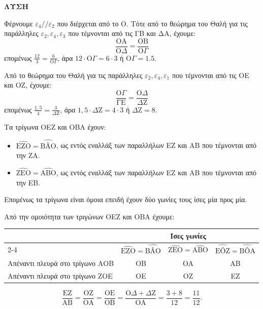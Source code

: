 \textbf{ΛΥΣΗ}
\begin{alist}
\item Φέρνουμε $\varepsilon_4 // \varepsilon_2$ που διέρχεται από το Ο. Τότε από το θεώρημα του Θαλή για τις παράλληλες $\varepsilon_2, \varepsilon_4, \varepsilon_3$ που τέμνονται από τις ΓΒ και ΔΑ, έχουμε:
\[\frac{\text{OA}}{\text{O}\Delta} = \frac{\text{OB}}{\text{O}\Gamma}\]
επομένως $\frac{12}{3} = \frac{6}{\text{O}\Gamma}$, άρα $12 \cdot \text{O}\Gamma = 6 \cdot 3$ ή $\text{O}\Gamma = 1.5$.

Από το θεώρημα του Θαλή για τις παράλληλες $\varepsilon_2, \varepsilon_4, \varepsilon_1$ που τέμνονται από τις ΟΕ και ΟΖ, έχουμε:
\[\frac{\text{O}\Gamma}{\text{ΓΕ}} = \frac{\text{O}\Delta}{\Delta\text{Z}}\]
επομένως $\frac{1,5}{4} = \frac{3}{\Delta\text{Z}}$, άρα $1,5 \cdot \Delta\text{Z} = 4 \cdot 3$ ή $\Delta\text{Z} = 8$.

\item Τα τρίγωνα OEZ και OBA έχουν:
\begin{itemize}
    \item $\widehat{\text{EZO}} = \widehat{\text{BÂO}}$, ως εντός εναλλάξ των παραλλήλων ΕΖ και ΑΒ που τέμνονται από την ΖΑ.
    \item $\widehat{\text{ZEO}} = \widehat{\text{AΒO}}$, ως εντός εναλλάξ των παραλλήλων ΕΖ και ΑΒ που τέμνονται από την ΕΒ.
\end{itemize}
Επομένως τα τρίγωνα είναι όμοια επειδή έχουν δύο γωνίες τους ίσες μία προς μία.

\item Από την ομοιότητα των τριγώνων OEZ και OBA έχουμε:
\begin{center}
\begin{tabular}{|l|c|c|c|}
\rowcolor{secondarycolor!20}
\multicolumn{1}{|c|}{} & \multicolumn{3}{c|}{Ίσες γωνίες} \\
\cline{2-4}
\rowcolor{secondarycolor!20}
\multicolumn{1}{|c|}{} & $\widehat{\text{EZO}} = \widehat{\text{BÂO}}$ & $\widehat{\text{ZEO}} = \widehat{\text{AΒO}}$ & $\widehat{\text{EÔZ}} = \widehat{\text{BÔA}}$ \\
\hline
\rowcolor{secondarycolor!10}
Απέναντι πλευρά στο τρίγωνο ΑΟΒ & OB & OA & AB \\
\rowcolor{secondarycolor!10}
Απέναντι πλευρά στο τρίγωνο ΖΟΕ & OE & OZ & EZ \\
\hline
\end{tabular}
\end{center}
\[\frac{\text{EZ}}{\text{AB}} = \frac{\text{OZ}}{\text{OA}} = \frac{\text{OE}}{\text{OB}} = \frac{\text{O}\Delta + \Delta\text{Z}}{\text{OA}} = \frac{3 + 8}{12} = \frac{11}{12}.\]
\end{alist}